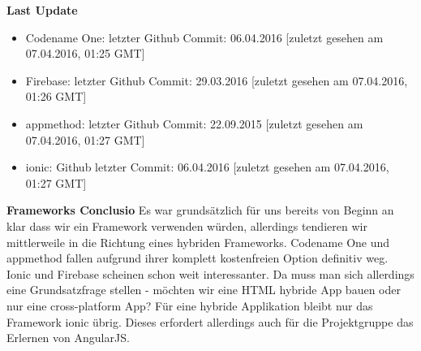 \textbf{Last Update}
\begin{itemize}
\item Codename One: letzter Github Commit: 06.04.2016 [zuletzt gesehen am 07.04.2016, 01:25 GMT]
\item Firebase: letzter Github Commit: 29.03.2016 [zuletzt gesehen am 07.04.2016, 01:26 GMT]
\item appmethod: letzter Github Commit: 22.09.2015 [zuletzt gesehen am 07.04.2016, 01:27 GMT]
\item ionic: Github letzter Commit: 06.04.2016 [zuletzt gesehen am 07.04.2016, 01:27 GMT]
\end{itemize}

\textbf{Frameworks Conclusio}
Es war grundsätzlich für uns bereits von Beginn an klar dass wir ein Framework verwenden würden, allerdings tendieren wir mittlerweile in die Richtung eines hybriden Frameworks. Codename One und appmethod fallen aufgrund ihrer komplett kostenfreien Option definitiv weg. Ionic und Firebase scheinen schon weit interessanter.
Da muss man sich allerdings eine Grundsatzfrage stellen - möchten wir eine HTML hybride App bauen oder nur eine cross-platform App? Für eine hybride Applikation bleibt nur das Framework ionic übrig. Dieses erfordert allerdings auch für die Projektgruppe das Erlernen von AngularJS.
\clearpage %